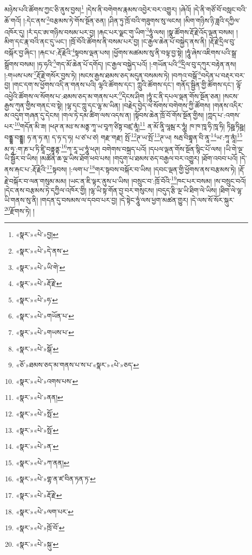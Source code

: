 མཉེས་པའི་ཚོགས་ཀྱང་ཅི་ནུས་བྱས།\footnote{«སྣར་»«པེ་»བྱ།} །དེས་ནི་བགེགས་རྣམས་འབྱེར་བར་འགྱུར། །ཞེའོ། །དེ་ནི་གཙོ་བོ་བསླང་བའི་ཆོ་གའོ། །:དེང་ནས་\footnote{«སྣར་»«པེ་»དེ་ནས་}བརྩམས་ཏེ་གོས་སྔོན་ཅན། །ཤིན་ཏུ་ཁྲོ་བའི་གཟུགས་སུ་ལངས། །མིག་གཉིས་ཉི་ཟླའི་དཀྱིལ་འཁོར་དུ། །རཾ་དང་ཨ་གཉིས་བསམ་པར་བྱ། །རྐང་པར་ལྗང་གུ་ཡིག་\footnote{«སྣར་»«པེ་»ཡི་གེ་}ཧཱུཾ་ལས། །སྣ་ཚོགས་རྡོ་རྗེ་འོད་ལྡན་བསམ། །མིག་དང་རྣ་བའི་ནང་དུ་ཡང་། །ཁྲོ་བོའི་ཚོགས་ནི་བསམ་པར་བྱ། །ང་རྒྱལ་ཆེན་པོ་བསྐྱེད་ནས་ནི། །རྡོ་རྗེ་དྲིལ་བུ་བསྐོར་བྱ་ཞིང་། །རྐང་པ་:རྡོ་རྗེའི་\footnote{«སྣར་»«པེ་»རྡོ་རྗེ་}སྟབས་ལྡན་པས། །ཕྱོགས་མཚམས་སུ་ནི་བལྟ་བྱ་སྟེ། །ཧཱུཾ་ཞེས་འཇིགས་པའི་སྒྲ་སྒྲོགས་བསམ། །ཧ་ཧའི་\footnote{«སྣར་»«པེ་»ཧ་}གད་མོ་ཆེན་པོ་དགོད། །ང་རྒྱལ་བསྐྱེད་པའོ། །:གཡོན་པའི་\footnote{«སྣར་»«པེ་»གཡོན་པ་}དྲིལ་བུ་དཀུར་བརྟེན་ནས། །:གཡས་པས་\footnote{«སྣར་»«པེ་»གཡས་པ་}རྡོ་རྗེ་གསོར་བྱས་ཏེ། །སངས་རྒྱས་ཐམས་ཅད་མདུན་བསམས་ཏེ། །བཀའ་བསྒོ་\footnote{«སྣར་»«པེ་»སྒོ་}བདེན་པ་བརྡར་བར་བྱ། །གང་དག་ས་ཕྱོགས་འདི་ན་གནས་པའི། ལྷའི་ཚོགས་དང་། ཀླུའི་ཚོགས་དང་། གནོད་སྦྱིན་གྱི་ཚོགས་དང་། ལྟོ་འཕྱེའི་ཚོགས་ལ་སོགས་པ་:ཐམས་ཅད་མ་གནས་པར་\footnote{«ཅོ་»ཐམས་ཅད་མ་གནས་པ་ས་པ་«སྣར་»«པེ་»ཅད་}དེངས་ཤིག །ཧཱུཾ་ང་ནི་དཔལ་ལྡན་གོས་སྔོན་ཅན། །སངས་རྒྱས་ཀུན་གྱིས་གནང་བ་སྟེ། །ལྷ་དང་ཀླུ་དང་ལྷ་མ་ཡིན། །བརྗེད་བྱེད་ལ་སོགས་བགེགས་ཀྱི་ཚོགས། །གནས་འདིར་མ་འདུག་གཞན་དུ་དེངས། །གལ་ཏེ་དམ་ཚིག་ལས་འདས་ན། །སྟོབས་ཆེན་ཁྲོ་བོ་གོས་སྔོན་གྱིས། །ཀླད་པ་:འགས་པར་\footnote{«སྣར་»«པེ་»འགས་པས་}གདོན་མི་ཟ། །ཕཊ་ན་མཿ་ས་མནྟ་ཀཱ་ཡ་བཱཀ་ཙིཏྟ་བཛྲ་ནཱཾ།\footnote{«སྣར་»«པེ་»ནན།} ན་མོ་ནཱི་ལཱམྦ་ར་ཧཱུཾ། ཁ་ཁ་ཁཱ་ཧི་ཁཱ་ཧི། ཏིཥྛ་ཏིཥྛ། བནྡྷ་བནྡྷ། ཧ་ན་ཧ་ན། ད་ཧ་ད་ཧ། པ་ཙ་པ་ཙ། གརྫ་གརྫ། སྤོ་\footnote{«སྣར་»«པེ་»སྥོ་}ཊ་ཡ་སྤོ་\footnote{«སྣར་»«པེ་»སྥོ་}ཊ་ཡ། སརྦ་བིགྷཱན་བི་ནཱ་\footnote{«སྣར་»«པེ་»ན་}ཡ་:ཀཱ་ནཱཾ།\footnote{«སྣར་»«པེ་»ཀ་ནན།} མ་ཧཱ་:ག་ཎ་པ་ཏི་ཛཱི་བནྟཱནྟ་\footnote{«སྣར་»«པེ་»གྷ་ན་ཛ་བིན་ཏན་ཏ་}ཀ་རཱ་ཡ་ཧཱུཾ་ཕཊ། བགེགས་བསྐྲད་པའོ། །དཔལ་ལྡན་གོས་སྔོན་སྙིང་པོ་ལས། །ཡི་གེ་ལྔ་ཡི་སྦྱོར་བ་ཡིས། །མཚོན་ཆ་ལྔ་ཡིས་ཐོག་ཕབ་པས། །གདུག་པ་ཐམས་ཅད་བརྒྱལ་བར་འགྱུར། །ཐོག་འབབ་པའོ། །དེ་ནས་རྐང་པ་:རྡོ་རྗེའི་\footnote{«སྣར་»«པེ་»རྡོ་རྗེ་}སྟབས། །:ལག་པ་\footnote{«སྣར་»«པེ་»ལག་པར་}གར་སྟབས་བསྐོར་བ་ཡིས། །དབང་ལྡན་གྱི་ཕྱོགས་ནས་བརྩམས་ཏེ། །རྡོ་རྗེ་བསྐོར་བ་ལན་གསུམ་མམ། །ཡང་ན་ཇི་ལྟར་ནུས་པ་ཡིས། །བསྲུང་བ་:ཁྲོ་བོའི་\footnote{«སྣར་»«པེ་»ཁྲོ་བོ་}ཁང་པར་བསམ། །ས་བསྲུང་བའོ། །དེང་ནས་བརྩམས་ཏེ་དཀྱིལ་འཁོར་གྱི། །ལྷ་ཡི་སྟ་གོན་བྱ་བར་གསུངས། །བདུད་རྩི་ལྔ་ཡི་ཐིག་ལེ་ཡིས། །ཐིག་ལེ་ལྷ་ཡི་གནས་སུ་ནི། །གདན་དུ་བསམས་ལ་དབབ་པར་བྱ། །དེ་སྟེང་ཧཱུཾ་ལས་ཕྱག་མཚན་གྱུར། །དེ་ལས་སོ་སོར་སྐུར་\footnote{«སྣར་»«པེ་»སྐུ་}རྫོགས་ཏེ། །
